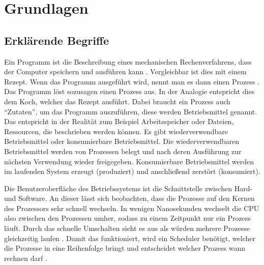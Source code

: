 \chapter{Grundlagen}
\label{grundlagen}
\section{Erklärende Begriffe}
\label{sec:begriffe}
Ein Programm ist die Beschreibung eines mechanischen Rechenverfahrens, dass der Computer speichern und ausführen kann \parencite[vgl.][14]{rechenberg2000}. Vergleichbar ist dies mit einem Rezept. Wenn das Programm ausgeführt wird, nennt man es dann einen Prozess \parencite[vgl.][S.71]{tanenbaum2016}. Das Programm löst sozusagen einen Prozess aus. In der Analogie entspricht dies dem Koch, welcher das Rezept ausführt. Dabei braucht ein Prozess auch “Zutaten”, um das Programm auszuführen, diese werden Betriebsmittel genannt. Das entspricht in der Realität zum Beispiel Arbeitsspeicher oder Dateien, Ressourcen, die beschrieben werden können. Es gibt wiederverwendbare Betriebsmittel oder konsumierbare Betriebsmittel. Die wiederverwendbaren Betriebsmittel werden von Prozessen belegt und nach deren Ausführung zur nächsten Verwendung  wieder freigegeben. Konsumierbare Betriebsmittel werden im laufenden System erzeugt (produziert) und anschließend zerstört (konsumiert).


Die Benutzeroberfläche des Betriebssystems ist die Schnittstelle zwischen Hard- und Software. An dieser lässt sich beobachten, dass die Prozesse auf den Kernen des Prozessors sehr schnell wechseln. In wenigen Nanosekunden wechselt die CPU also zwischen den Prozessen umher, sodass zu einem Zeitpunkt nur ein Prozess läuft. Durch das schnelle Umschalten sieht es aus als würden mehrere Prozesse gleichzeitig laufen \parencite[vgl.][S.466]{sommer2002}. Damit  das funktioniert, wird ein Scheduler benötigt, welcher die Prozesse in eine Reihenfolge bringt und entscheidet welcher Prozess wann rechnen darf \parencite[vgl.][S.199]{tanenbaum2016}.

